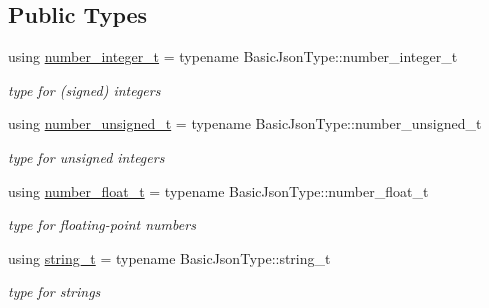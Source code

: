 \subsection*{Public Types}
\begin{DoxyCompactItemize}
\item 
\mbox{\label{structnlohmann_1_1json__sax_a0cef30121f02b7fee85e9708148ea0aa}} 
using \mbox{\hyperlink{structnlohmann_1_1json__sax_a0cef30121f02b7fee85e9708148ea0aa}{number\+\_\+integer\+\_\+t}} = typename Basic\+Json\+Type\+::number\+\_\+integer\+\_\+t
\begin{DoxyCompactList}\small\item\em type for (signed) integers \end{DoxyCompactList}\item 
\mbox{\label{structnlohmann_1_1json__sax_a32028cc056ae0f43aaae331cdbbbf856}} 
using \mbox{\hyperlink{structnlohmann_1_1json__sax_a32028cc056ae0f43aaae331cdbbbf856}{number\+\_\+unsigned\+\_\+t}} = typename Basic\+Json\+Type\+::number\+\_\+unsigned\+\_\+t
\begin{DoxyCompactList}\small\item\em type for unsigned integers \end{DoxyCompactList}\item 
\mbox{\label{structnlohmann_1_1json__sax_a390c209bffd8c4800c8f3076dc465a20}} 
using \mbox{\hyperlink{structnlohmann_1_1json__sax_a390c209bffd8c4800c8f3076dc465a20}{number\+\_\+float\+\_\+t}} = typename Basic\+Json\+Type\+::number\+\_\+float\+\_\+t
\begin{DoxyCompactList}\small\item\em type for floating-\/point numbers \end{DoxyCompactList}\item 
\mbox{\label{structnlohmann_1_1json__sax_ae01977a9f3c5b3667b7a2929ed91061e}} 
using \mbox{\hyperlink{structnlohmann_1_1json__sax_ae01977a9f3c5b3667b7a2929ed91061e}{string\+\_\+t}} = typename Basic\+Json\+Type\+::string\+\_\+t
\begin{DoxyCompactList}\small\item\em type for strings \end{DoxyCompactList}\end{DoxyCompactItemize}
